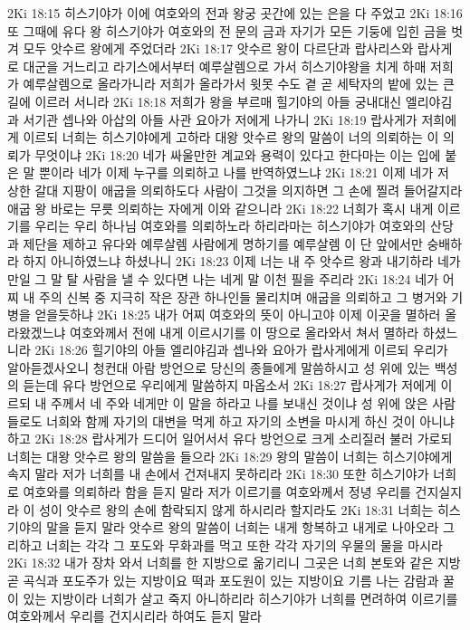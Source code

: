 2Ki 18:15  히스기야가 이에 여호와의 전과 왕궁 곳간에 있는 은을 다 주었고
2Ki 18:16  또 그때에 유다 왕 히스기야가 여호와의 전 문의 금과 자기가 모든 기둥에 입힌 금을 벗겨 모두 앗수르 왕에게 주었더라
2Ki 18:17  앗수르 왕이 다르단과 랍사리스와 랍사게로 대군을 거느리고 라기스에서부터 예루살렘으로 가서 히스기야왕을 치게 하매 저희가 예루살렘으로 올라가니라 저희가 올라가서 윗못 수도 곁 곧 세탁자의 밭에 있는 큰 길에 이르러 서니라
2Ki 18:18  저희가 왕을 부르매 힐기야의 아들 궁내대신 엘리야김과 서기관 셉나와 아삽의 아들 사관 요아가 저에게 나가니
2Ki 18:19  랍사게가 저희에게 이르되 너희는 히스기야에게 고하라 대왕 앗수르 왕의 말씀이 너의 의뢰하는 이 의뢰가 무엇이냐
2Ki 18:20  네가 싸울만한 계교와 용력이 있다고 한다마는 이는 입에 붙은 말 뿐이라 네가 이제 누구를 의뢰하고 나를 반역하였느냐
2Ki 18:21  이제 네가 저 상한 갈대 지팡이 애굽을 의뢰하도다 사람이 그것을 의지하면 그 손에 찔려 들어갈지라 애굽 왕 바로는 무릇 의뢰하는 자에게 이와 같으니라
2Ki 18:22  너희가 혹시 내게 이르기를 우리는 우리 하나님 여호와를 의뢰하노라 하리라마는 히스기야가 여호와의 산당과 제단을 제하고 유다와 예루살렘 사람에게 명하기를 예루살렘 이 단 앞에서만 숭배하라 하지 아니하였느냐 하셨나니
2Ki 18:23  이제 너는 내 주 앗수르 왕과 내기하라 네가 만일 그 말 탈 사람을 낼 수 있다면 나는 네게 말 이천 필을 주리라
2Ki 18:24  네가 어찌 내 주의 신복 중 지극히 작은 장관 하나인들 물리치며 애굽을 의뢰하고 그 병거와 기병을 얻을듯하냐
2Ki 18:25  내가 어찌 여호와의 뜻이 아니고야 이제 이곳을 멸하러 올라왔겠느냐 여호와께서 전에 내게 이르시기를 이 땅으로 올라와서 쳐서 멸하라 하셨느니라
2Ki 18:26  힐기야의 아들 엘리야김과 셉나와 요아가 랍사게에게 이르되 우리가 알아듣겠사오니 청컨대 아람 방언으로 당신의 종들에게 말씀하시고 성 위에 있는 백성의 듣는데 유다 방언으로 우리에게 말씀하지 마옵소서
2Ki 18:27  랍사게가 저에게 이르되 내 주께서 네 주와 네게만 이 말을 하라고 나를 보내신 것이냐 성 위에 앉은 사람들로도 너희와 함께 자기의 대변을 먹게 하고 자기의 소변을 마시게 하신 것이 아니냐 하고
2Ki 18:28  랍사게가 드디어 일어서서 유다 방언으로 크게 소리질러 불러 가로되 너희는 대왕 앗수르 왕의 말씀을 들으라
2Ki 18:29  왕의 말씀이 너희는 히스기야에게 속지 말라 저가 너희를 내 손에서 건져내지 못하리라
2Ki 18:30  또한 히스기야가 너희로 여호와를 의뢰하라 함을 듣지 말라 저가 이르기를 여호와께서 정녕 우리를 건지실지라 이 성이 앗수르 왕의 손에 함락되지 않게 하시리라 할지라도
2Ki 18:31  너희는 히스기야의 말을 듣지 말라 앗수르 왕의 말씀이 너희는 내게 항복하고 내게로 나아오라 그리하고 너희는 각각 그 포도와 무화과를 먹고 또한 각각 자기의 우물의 물을 마시라
2Ki 18:32  내가 장차 와서 너희를 한 지방으로 옮기리니 그곳은 너희 본토와 같은 지방 곧 곡식과 포도주가 있는 지방이요 떡과 포도원이 있는 지방이요 기름 나는 감람과 꿀이 있는 지방이라 너희가 살고 죽지 아니하리라 히스기야가 너희를 면려하여 이르기를 여호와께서 우리를 건지시리라 하여도 듣지 말라
